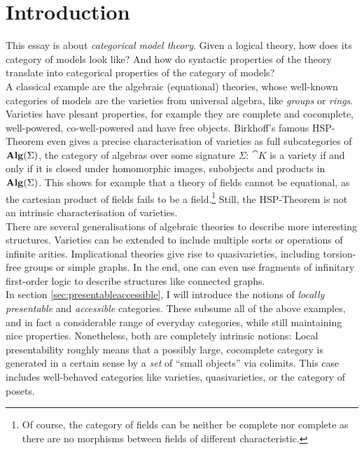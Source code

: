 \section*{Introduction}
{}

This essay is about \emph{categorical model theory}. Given a logical theory, how does its category of models look like? And how do syntactic properties of the theory translate into categorical properties of the category of models? \\

A classical example are the algebraic (equational) theories, whose well-known categories of models are the varieties from universal algebra, like \emph{groups} or \emph{rings}. Varieties have plesant properties, for example they are complete and cocomplete, well-powered, co-well-powered and have free objects. Birkhoff's famous HSP-Theorem even gives a precise characterisation of varieties as full subcategories of $\mathbf{Alg}(\Sigma)$, the category of algebras over some signature $\Sigma$: $\cat K$ is a variety if and only if it is closed under homomorphic images, subobjects and products in $\mathbf{Alg}(\Sigma)$. 
This shows for example that a theory of fields cannot be equational, as the cartesian product of fields fails to be a field.\footnote{Of course, the category of fields can be neither be complete nor complete as there are no morphisms between fields of different characteristic.}
Still, the HSP-Theorem is not an intrinsic characterisation of varieties. \\

There are several generalisations of algebraic theories to describe more interesting structures. Varieties can be extended to include multiple sorts or operations of infinite arities. Implicational theories give rise to quasivarieties, including torsion-free groups or simple graphs. In the end, one can even use fragments of infinitary first-order logic to describe structures like connected graphs. \\

In section \ref{sec:presentableaccessible}, I will introduce the notions of \emph{locally presentable} and \emph{accessible} categories. These subsume all of the above examples, and in fact a considerable range of everyday categories, while still maintaining nice properties. Nonetheless, both are completely intrinsic notions: Local presentability roughly means that a possibly large, cocomplete category is generated in a certain sense by a \emph{set} of ``small objects'' via colimits. This case includes well-behaved categories like varieties, quasivarieties, or the category of posets. \\

